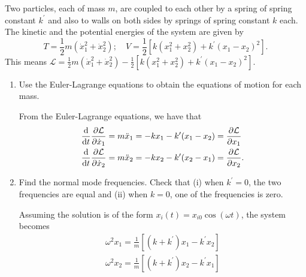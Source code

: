 \documentclass[11pt]{article}
\begin{document}
Two particles, each of mass $m$, are coupled to each other by a spring of spring constant $k^{\prime}$ and also to walls on both sides by springs of spring constant $k$ each. The kinetic and the potential energies of the system are given by 
\[T = \frac{1}{2}m(\dot{x}_1^2 + \dot{x}_2^2);\quad V = \frac{1}{2}[k(x_1^2+x_2^2) + k^{\prime}(x_1 - x_2)^2].\] This means $\mathcal{L} = \frac{1}{2}m(\dot{x}_1^2 + \dot{x}_2^2) - \frac{1}{2}[k(x_1^2+x_2^2) + k^{\prime}(x_1 - x_2)^2]$.
\begin{enumerate}[label=(\alph*)]
    \item Use the Euler-Lagrange equations to obtain the equations of motion for each mass.
    
    From the Euler-Lagrange equations, we have that \begin{align*}
        \dv{t}\pdv{\mathcal{L}}{\dot{x}_1} = m\ddot{x}_1 &= -kx_1 - k^{\prime}(x_1-x_2) = \pdv{\mathcal{L}}{x_1} \\
        \dv{t}\pdv{\mathcal{L}}{\dot{x}_2} = m\ddot{x}_2 &= -kx_2 - k^{\prime}(x_2-x_1) = \pdv{\mathcal{L}}{x_2}.
    \end{align*}
    \item Find the normal mode frequencies. Check that (i) when $k^{\prime} = 0$, the two frequencies are equal and (ii) when $k = 0$, one of the frequencies is zero.
    
    Assuming the solution is of the form $x_i(t) = x_{i0}\cos(\omega t)$, the system becomes
    \begin{align*}
        \omega^2 x_1 = \frac{1}{m}[(k+k^{\prime})x_1 - k^{\prime} x_2] \\
        \omega^2 x_2 = \frac{1}{m}[(k+k^{\prime})x_2 - k^{\prime} x_1] 
    \end{align*}
    

\end{enumerate}
\end{document}
